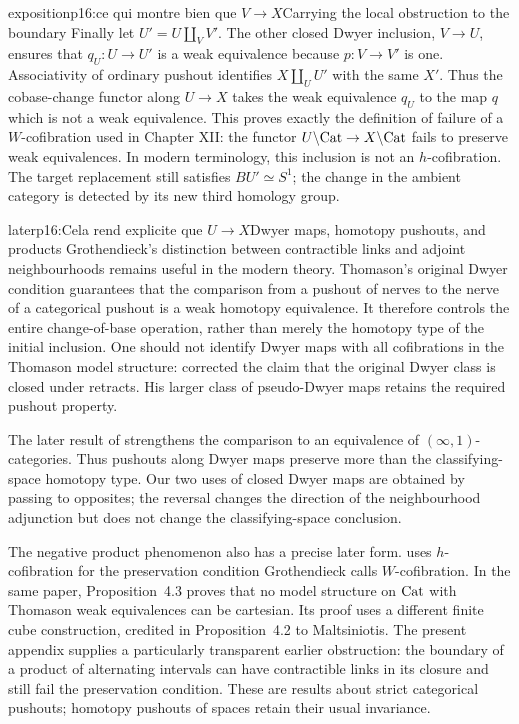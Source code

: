 \begin{dcomment}{exposition}{p16:ce qui montre bien que $V \longrightarrow X$}{Carrying the local obstruction to the boundary}
Finally let $U'=U\amalg_VV'$. The other closed Dwyer inclusion, $V\to U$, ensures that $q_U:U\to U'$ is a weak equivalence because $p:V\to V'$ is one. Associativity of ordinary pushout identifies $X\amalg_UU'$ with the same $X'$. Thus the cobase-change functor along $U\to X$ takes the weak equivalence $q_U$ to the map $q$ which is not a weak equivalence. This proves exactly the definition of failure of a $W$-cofibration used in Chapter XII: the functor $U\backslash\mathrm{Cat}\to X\backslash\mathrm{Cat}$ fails to preserve weak equivalences. In modern terminology, this inclusion is not an $h$-cofibration. The target replacement still satisfies $BU'\simeq S^1$; the change in the ambient category is detected by its new third homology group.
\end{dcomment}


\begin{dcomment}{later}{p16:Cela rend explicite que $U \longrightarrow X$}{Dwyer maps, homotopy pushouts, and products}
Grothendieck's distinction between contractible links and adjoint neighbourhoods remains useful in the modern theory. Thomason's original Dwyer condition guarantees that the comparison from a pushout of nerves to the nerve of a categorical pushout is a weak homotopy equivalence. It therefore controls the entire change-of-base operation, rather than merely the homotopy type of the initial inclusion. One should not identify Dwyer maps with all cofibrations in the Thomason model structure: \citet[Lemma~4 and Proposition~2]{Cisinski1999Dwyer} corrected the claim that the original Dwyer class is closed under retracts. His larger class of pseudo-Dwyer maps retains the required pushout property.

The later result of \citet[Theorems~1.5--1.6]{HackneyOzornovaRiehlRovelli2024} strengthens the comparison to an equivalence of $(\infty,1)$-categories. Thus pushouts along Dwyer maps preserve more than the classifying-space homotopy type. Our two uses of closed Dwyer maps are obtained by passing to opposites; the reversal changes the direction of the neighbourhood adjunction but does not change the classifying-space conclusion.

The negative product phenomenon also has a precise later form. \citet[Definition~2.6]{Pavlov2024Thomason} uses $h$-cofibration for the preservation condition Grothendieck calls $W$-cofibration. In the same paper, Proposition~4.3 proves that no model structure on $\mathrm{Cat}$ with Thomason weak equivalences can be cartesian. Its proof uses a different finite cube construction, credited in Proposition~4.2 to Maltsiniotis. The present appendix supplies a particularly transparent earlier obstruction: the boundary of a product of alternating intervals can have contractible links in its closure and still fail the preservation condition. These are results about strict categorical pushouts; homotopy pushouts of spaces retain their usual invariance.
\end{dcomment}


